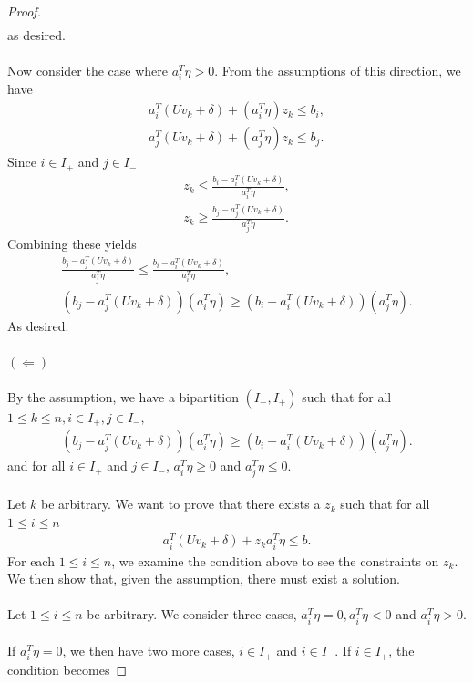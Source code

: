 \documentclass[a4paper]{amsart}
\theoremstyle{remark}
\begin{document}
\begin{proof}
\begin{gather*}
	\end{gather*}
	as desired.\\\\
	Now consider the case where $a_i^T\eta > 0$. From the assumptions of this direction, we have
	\begin{gather*}
		a_i^T(Uv_k+\delta) + (a_i^T\eta)z_k \leq b_i,\\
		a_j^T(Uv_k+\delta) + (a_j^T\eta)z_k \leq b_j.
	\end{gather*}
	Since $i \in I_+$ and $j \in I_-$
	\begin{gather*}
		z_k \leq \frac{b_i-a_i^T(Uv_k+\delta)}{a_i^T\eta},\\
		z_k \geq \frac{b_j-a_j^T(Uv_k+\delta)}{a_j^T\eta}.
	\end{gather*}
	Combining these yields
	\begin{gather*}
		\frac{b_j-a_j^T(Uv_k+\delta)}{a_j^T\eta} \leq \frac{b_i-a_i^T(Uv_k+\delta)}{a_i^T\eta},\\
		(b_j-a_j^T(Uv_k+\delta))(a_i^T\eta) \geq (b_i-a_i^T(Uv_k+\delta))(a_j^T\eta).
	\end{gather*}
	As desired.\\\\
	$(\Longleftarrow)$
	\\\\
	By the assumption, we have a bipartition $(I_-,I_+)$ such that for all $1 \leq k \leq n, i \in I_+, j \in I_-,$
	\begin{gather*}
		(b_j-a_j^T(Uv_k+\delta))(a_i^T\eta) \geq (b_i-a_i^T(Uv_k+\delta))(a_j^T\eta).
	\end{gather*}
    and for all $i \in I_+$ and $j \in I_-$, $a_i^T\eta \geq 0$ and $a_j^T \eta \leq 0$.\\\\
	Let $k$ be arbitrary. We want to prove that there exists a $z_k$ such that for all $1 \leq i \leq n$
	\begin{gather*}
		a_i^T(Uv_k+\delta)+z_ka_i^T\eta \leq b.
	\end{gather*}
    For each $1 \leq i \leq n$, we examine the condition above to see the constraints on $z_k$. We then show that, given the assumption, there must exist a solution.\\\\
	Let $1 \leq i \leq n$ be arbitrary. We consider three cases, $a_i^T\eta = 0, a_i^T\eta < 0$ and $a_i^T\eta  > 0$.\\\\
	If $a_i^T \eta = 0$, we then have two more cases, $i \in I_+$ and $i \in I_-$. If $i \in I_+$, the condition becomes

\end{proof}
\end{document}
